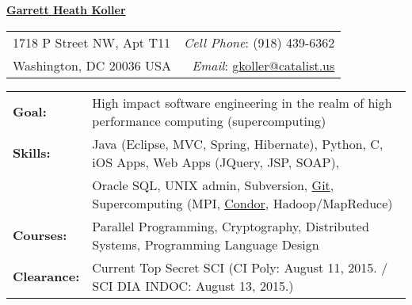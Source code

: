 \documentclass[11pt, letterpaper]{letter}
\newlength{\firstSectionSpacing}	\setlength{\firstSectionSpacing}{6pt}
\newlength{\sectionSpacing}			\setlength{\sectionSpacing}{-1pt}
\begin{document}
\sffamily

\begin{center}
\underline{\Large{\textbf{Garrett Heath Koller}}}
\end{center}
\vspace{-8pt}
\begin{tabular*}{\textwidth}{l@{\extracolsep{\fill}}r}
1718 P Street NW, Apt T11 & \textit{Cell Phone}: (918) 439-6362 \\
Washington, DC  20036 USA & \textit{Email}:
\href{mailto:gkoller@catalist.us}{gkoller@catalist.us} \\
\hline
\end{tabular*}

\vspace{\firstSectionSpacing}


\begin{tabular*}{\textwidth}{ p{2.2cm} l }
{\large \textbf{Goal:}}		& High impact software engineering in the realm of 
							  high performance computing (supercomputing) \\
{\large \textbf{Skills:}}		& Java (Eclipse, MVC, Spring, Hibernate), Python, C,
							  iOS Apps, Web Apps (JQuery, JSP, SOAP), \\
							& Oracle SQL, UNIX admin, Subversion, 
							  \href{https://github.com/garrettheath4}{Git},
							  Supercomputing (MPI, \href{http://www.htcondorproject.org/}{Condor},
							  Hadoop/MapReduce) \\
{\large \textbf{Courses:}}		& Parallel Programming, Cryptography, 
							  Distributed Systems, Programming Language Design \\
{\large \textbf{Clearance:}}	& Current Top Secret SCI (CI Poly: August 11, 2015.  /  SCI DIA INDOC: August 13, 2015.)
\end{tabular*}

\vspace{\firstSectionSpacing}
\vspace{\sectionSpacing}

\end{document}
